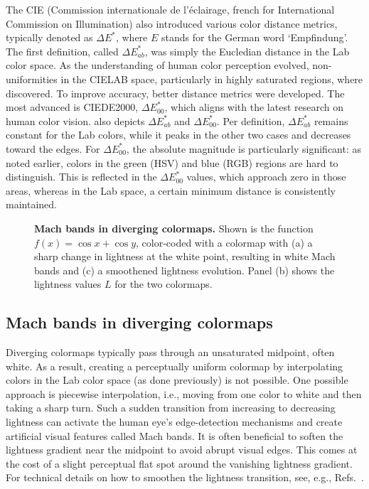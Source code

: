 The CIE (Commission internationale de l'éclairage, french for International Commission on Illumination) also introduced various color distance metrics, typically denoted as $\Delta E^*$, where $E$ stands for the German word `Empfindung'. The first definition, called $\Delta E^*_{ab}$, was simply the Eucledian distance in the Lab color space. As the understanding of human color perception evolved, non-uniformities in the CIELAB space, particularly in highly saturated regions, where discovered. To improve accuracy, better distance metrics were developed. The most advanced is CIEDE2000, $\Delta E^*_{00}$, which aligns with the latest research on human color vision. 
 also depicts $\Delta E^*_{ab}$ and $\Delta E^*_{00}$. 
Per definition, $\Delta E^*_{ab}$ remains constant for the Lab colors, while it peaks in the other two cases and decreases toward the edges. For $\Delta E^*_{00}$, the absolute magnitude is particularly significant: as noted earlier, colors in the green (HSV) and blue (RGB) regions are hard to distinguish. This is reflected in the $\Delta E^*_{00}$ values, which approach zero in those areas, whereas in the Lab space, a certain minimum distance is consistently maintained.



\begin{figure}
	\centering
	
	\caption{\textbf{Mach bands in diverging colormaps.} Shown is the function $f(x) = \cos x + \cos y$, color-coded with a colormap with (a) a sharp change in lightness at the white point, resulting in white Mach bands and (c) a smoothened lightness evolution. Panel (b) shows the lightness values $L$ for the two colormaps.}
	\label{fig:machbands}
\end{figure}

\subsection{Mach bands in diverging colormaps}

Diverging colormaps typically pass through an unsaturated midpoint, often white. As a result, creating a perceptually uniform colormap by interpolating colors in the Lab color space (as done previously) is not possible. One possible approach is piecewise interpolation, i.e., moving from one color to white and then taking a sharp turn.  Such a sudden transition from increasing to decreasing lightness can activate the human eye's edge-detection mechanisms and create artificial visual features called Mach bands. It is often beneficial to soften the lightness gradient near the midpoint to avoid abrupt visual edges. This comes at the cost of a slight perceptual flat spot around the vanishing lightness gradient. For technical details on how to smoothen the lightness transition, see, e.g., Refs.~\cite{moreland2009,kovesi2015}.

